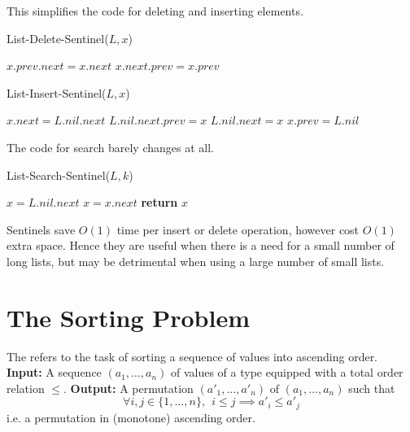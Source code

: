 \documentclass[11pt]{report}
\begin{document}
This simplifies the code for deleting and inserting elements.
\mypar
\begin{algorithm}
    [H]
    \caption{List-Delete-Sentinel($L,x$)}
    $x.prev.next = x.next$\;
    $x.next.prev = x.prev$\;
\end{algorithm}
\mypar
\begin{algorithm}
    [H]
    \caption{List-Insert-Sentinel($L,x$)}
    $x.next = L.nil.next$\;
    $L.nil.next.prev = x$\;
    $L.nil.next = x$\;
    $x.prev = L.nil$\;
\end{algorithm} 
\mypar
The code for search barely changes at all.
\mypar
\begin{algorithm}
    [H]
    \caption{List-Search-Sentinel($L,k$)}
    $x = L.nil.next$\;
    {$x = x.next$\;}
    \textbf{return }$x$\;
\end{algorithm}
\mypar
Sentinels save $O(1)$ time per insert or delete operation, however cost $O(1)$ extra space. Hence they are useful when there is a need for a small number of long lists, but may be detrimental when using a large number of small lists.
\pagebreak
\section{The Sorting Problem}
\begin{nproblem}
    The  refers to the task of sorting a sequence of values into ascending order.
    \mypar \textbf{Input:} A sequence $(a_1, \dots, a_n)$ of values of a type equipped with a total order relation $\leq$.
    \mypar \textbf{Output:} A permutation $(a'_1, \dots, a'_n)$ of $(a_1, \dots, a_n)$ such that 
    \[\forall i,j \in \{1,\dots,n \}, \ \  i \leq j \implies a'_i \leq a'_j  \]
    i.e. a permutation in (monotone) ascending order.
\end{nproblem}

\printindex
\end{document}
